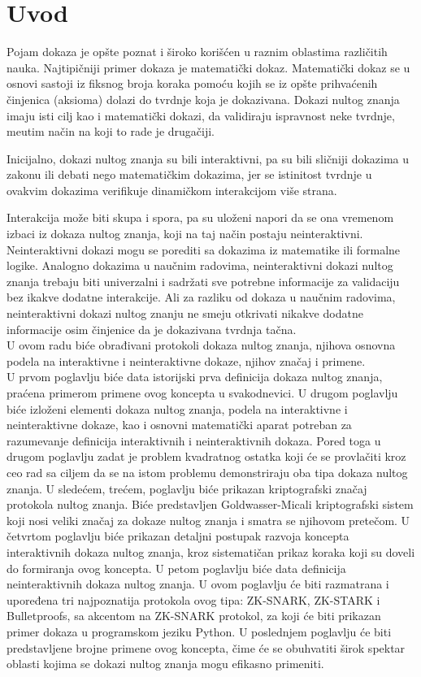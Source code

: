 \setcounter{chapter}{-1}
\chapter{Uvod}
Pojam dokaza je opšte poznat i \v siroko kori\v s\' cen u raznim oblastima različitih nauka. Najtipi\v cniji primer dokaza je matemati\v cki dokaz. Matemati\v cki dokaz se u osnovi sastoji iz fiksnog broja koraka pomo\' cu kojih se iz op\v ste prihva\' cenih \v cinjenica (aksioma) dolazi do tvrdnje koja je dokazivana. Dokazi nultog znanja imaju isti cilj kao i matemati\v cki dokazi, da validiraju ispravnost neke tvrdnje, me\dj utim na\v cin na koji to rade je druga\v ciji. 

Inicijalno, dokazi nultog znanja su bili interaktivni, pa su bili sli\v cniji dokazima u zakonu ili debati nego matematičkim dokazima, jer se istinitost tvrdnje u ovakvim dokazima verifikuje  dinami\v ckom interakcijom vi\v se strana.

 Interakcija može biti skupa i spora, pa su  uloženi napori da se ona vremenom izbaci iz dokaza nultog znanja, koji na taj način postaju neinteraktivni. Neinteraktivni dokazi mogu se porediti sa dokazima iz matematike ili formalne logike. Analogno dokazima u naučnim radovima, neinteraktivni dokazi nultog znanja trebaju biti univerzalni i sadržati sve potrebne informacije za validaciju bez ikakve dodatne interakcije. Ali za razliku od dokaza u naučnim radovima, neinteraktivni dokazi nultog znanju ne smeju otkrivati nikakve dodatne informacije osim činjenice da je dokazivana tvrdnja tačna.\\

U ovom radu biće obrađivani protokoli dokaza nultog znanja, njihova osnovna podela na interaktivne i neinteraktivne dokaze, njihov značaj i primene. \\
U prvom poglavlju biće data istorijski prva definicija  dokaza nultog znanja, praćena primerom primene ovog koncepta u svakodnevici. U drugom poglavlju biće izloženi elementi dokaza nultog znanja, podela na interaktivne i neinteraktivne dokaze, kao i osnovni matematički aparat potreban za razumevanje definicija interaktivnih i neinteraktivnih dokaza. Pored toga u drugom poglavlju zadat je problem kvadratnog ostatka koji će se provlačiti kroz ceo rad sa ciljem da se na istom problemu demonstriraju oba tipa dokaza nultog znanja. U sledećem, trećem, poglavlju biće prikazan kriptografski značaj protokola nultog znanja. Biće predstavljen \textenglish{Goldwasser-Micali} kriptografski sistem koji nosi veliki značaj za dokaze nultog znanja i smatra se njihovom pretečom. U četvrtom poglavlju biće prikazan detaljni postupak razvoja koncepta interaktivnih dokaza nultog znanja, kroz sistematičan prikaz koraka koji su doveli do formiranja ovog koncepta. U petom poglavlju biće data definicija neinteraktivnih dokaza nultog znanja. U ovom poglavlju će biti razmatrana i upoređena tri najpoznatija protokola ovog tipa: \textenglish{ZK-SNARK, ZK-STARK} i \textenglish{Bulletproofs}, sa akcentom na \textenglish{ZK-SNARK} protokol, za koji će biti prikazan primer dokaza u programskom jeziku  \textenglish{Python}. U poslednjem poglavlju će biti predstavljene brojne primene ovog koncepta, čime će se obuhvatiti širok spektar oblasti  kojima se dokazi nultog znanja mogu efikasno primeniti.

